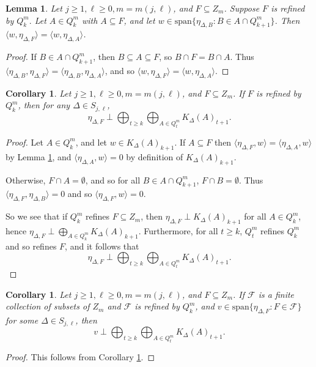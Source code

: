 \documentclass[12pt]{amsart}
\newcommand{\sse}{\subseteq}
\newcommand{\spn}{\text{span}}
\newcommand{\mc}[1]{\mathcal{#1}}
\newcommand{\emp}{\emptyset}
\newcommand{\De}{\Delta}
\theoremstyle{plain} %
\newtheorem{Lemma}[Theorem]{Lemma}
\newtheorem{Corollary}[Theorem]{Corollary}
\theoremstyle{definition} %
\begin{document}
\begin{Lemma}\label{lem if F is refined by 1}
    Let $j \geq 1, \ell \geq 0, m = m(j,\ell)$, and $F \sse Z_{m}$. Suppose $F$ is refined by $Q_k^m.$ Let $A \in Q_k^m$ with $A \sse F$, and let $w \in \spn\{\eta_{\De,B} : B \in A \cap Q_{k+1}^m \}$. Then $\langle w, \eta_{\De, F}\rangle = \langle w, \eta_{\De,A}\rangle$.
\end{Lemma}

\begin{proof}
    If $B \in A\cap Q_{k+1}^m$, then $B \sse A \sse F$, so $B \cap F = B\cap A$. Thus $\langle \eta_{\De,B}, \eta_{\De,F} \rangle = \langle \eta_{\De, B}, \eta_{\De,A}\rangle$, and so $\langle w, \eta_{\De, F}\rangle = \langle w, \eta_{\De,A}\rangle$.
\end{proof}

\begin{Corollary}\label{coro if F is refined by 2}
    Let $j \geq 1, \ell \geq 0, m = m(j,\ell)$, and $F \sse Z_{m}$. If $F$ is refined by $Q_k^m$, then for any $\De \in S_{j,\ell}$,
    \[ \eta_{\De,F} \perp \bigoplus_{t \geq k} \bigoplus_{A \in Q_t^m} K_{\De}(A)_{t+1}.\]
\end{Corollary}

\begin{proof}
    Let $A \in Q_k^m$, and let $w \in K_{\De}(A)_{k+1}$. If $A \sse F$ then $\langle \eta_{\De,F}, w\rangle = \langle \eta_{\De,A}, w\rangle$ by Lemma \ref{lem if F is refined by 1}, and $\langle \eta_{\De,A}, w\rangle = 0$ by definition of $K_{\De}(A)_{k+1}$.

    Otherwise, $F \cap A = \emp$, and so for all $B \in A \cap Q_{k+1}^m$, $F \cap B=\emp$. Thus $\langle \eta_{\De, F}, \eta_{\De, B} \rangle = 0$ and so $\langle\eta_{\De,F}, w\rangle = 0$.

    So we see that if $Q_k^m$ refines $F \sse Z_m$, then $\eta_{\De,F} \perp K_{\De}(A)_{k+1}$ for all $A \in Q_k^m$, hence $\eta_{\De,F} \perp \bigoplus_{A \in Q_k^m} K_{\De}(A)_{k+1}$. Furthermore, for all $t \ge k$, $Q_t^m$ refines $Q_k^m$ and so refines $F$, and it follows that 
    \[\eta_{\De,F} \perp \bigoplus_{t \geq k} \bigoplus_{A \in Q_t^m} K_{\De}(A)_{t+1}.\]
\end{proof}

\begin{Corollary}\label{coro if F is refined by 3}
    Let $j \geq 1, \ell \geq 0, m = m(j,\ell)$, and $F \sse Z_{m}$. If $\mc{F}$ is a finite collection of subsets of $Z_m$ and $\mc{F}$ is refined by $Q_k^m$, and $v \in \spn\{\eta_{\De,F}: F \in \mc{F}\}$ for some $\De \in S_{j,\ell}$, then
    \[ v \perp \bigoplus_{t \geq k} \bigoplus_{A \in Q_t^m} K_{\De}(A)_{t+1}.\]
\end{Corollary}
\begin{proof}
    This follows from Corollary \ref{coro if F is refined by 2}.
\end{proof}
\end{document}
